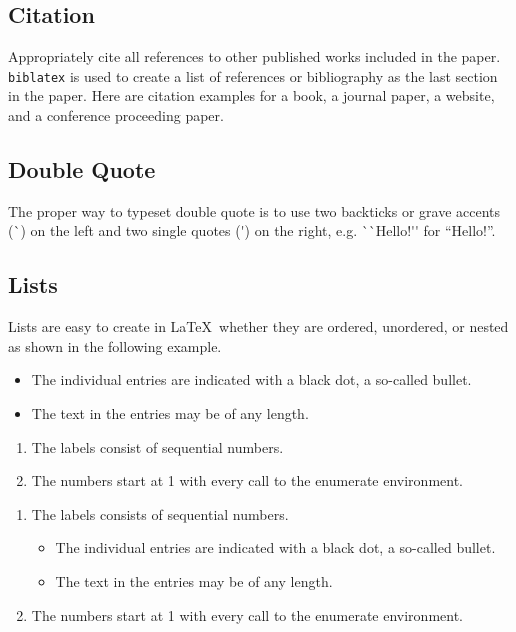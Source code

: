 \documentclass{article}
\begin{document}
\subsection{Citation}
Appropriately cite all references to other published works included in the paper.
\texttt{biblatex} is used to create a list of references or bibliography as the
last section in the paper. Here are citation examples for a
book\cite{latexcompanion}, a journal paper\cite{einstein}, a
website\cite{knuthwebsite}, and a conference proceeding paper\cite{maurer}.

\subsection{Double Quote}
The proper way to typeset double quote is to use two backticks or grave accents
(\`{}) on the left and two single quotes (\'{}) on the right, e.g.
\`{}\`{}Hello!\'{}\'{} for ``Hello!''.

\subsection{Lists}
Lists are easy to create in  \LaTeX\ whether they are ordered, unordered, or
nested as shown in the following example.

\begin{itemize}[noitemsep]
  \item The individual entries are indicated with a black dot, a so-called bullet.
  \item The text in the entries may be of any length.
\end{itemize}

\begin{enumerate}[noitemsep]
  \item The labels consist of sequential numbers.
  \item The numbers start at 1 with every call to the enumerate environment.
\end{enumerate}

\begin{enumerate}[noitemsep]
   \item The labels consists of sequential numbers.
   \begin{itemize}[noitemsep]
     \item The individual entries are indicated with a black dot, a so-called bullet.
     \item The text in the entries may be of any length.
   \end{itemize}
   \item The numbers start at 1 with every call to the enumerate environment.
\end{enumerate}
\end{document}
